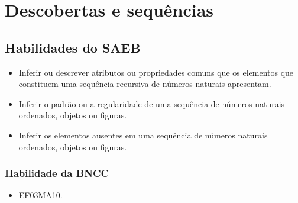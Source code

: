 
\chapter{Descobertas e sequências}
\enlargethispage{\baselineskip}

\section*{Habilidades do SAEB}

\begin{itemize}
\item Inferir ou descrever atributos ou propriedades comuns que os elementos
que constituem uma sequência recursiva de números naturais apresentam.

\item Inferir o padrão ou a regularidade de uma sequência de números
naturais ordenados, objetos ou figuras.

\item Inferir os elementos ausentes em uma sequência de números naturais
ordenados, objetos ou figuras.
\end{itemize}

\subsection{Habilidade da BNCC}

\begin{itemize}
\item EF03MA10.
\end{itemize}

\pagebreak

